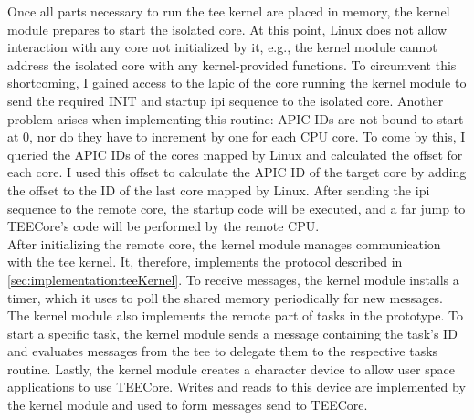 Once all parts necessary to run the \gls{tee} kernel are placed in memory, the
kernel module prepares to start the isolated core. At this point, Linux does not
allow interaction with any core not initialized by it, e.g., the kernel module
cannot address the isolated core with any kernel-provided functions. To
circumvent this shortcoming, I gained access to the \gls{lapic} of the core
running the kernel module to send the required INIT and startup \gls{ipi}
sequence to the isolated core. Another problem arises when implementing this
routine: APIC IDs are not bound to start at 0, nor do they have to increment by
one for each CPU core. To come by this, I queried the APIC IDs of the cores
mapped by Linux and calculated the offset for each core. I used this offset to
calculate the APIC ID of the target core by adding the offset to the ID of the
last core mapped by Linux. After sending the \gls{ipi} sequence to the remote
core, the startup code will be executed, and a far jump to TEECore's code will
be performed by the remote CPU.\\

After initializing the remote core, the kernel module manages communication with
the \gls{tee} kernel. It, therefore, implements the protocol described in
\ref{sec:implementation:teeKernel}. To receive messages, the kernel module
installs a timer, which it uses to poll the shared memory periodically for new
messages. The kernel module also implements the remote part of tasks in the
prototype. To start a specific task, the kernel module sends a message
containing the task's ID and evaluates messages from the \gls{tee} to delegate
them to the respective tasks routine. Lastly, the kernel module creates a
character device to allow user space applications to use TEECore. Writes and
reads to this device are implemented by the kernel module and used to form
messages send to TEECore.



